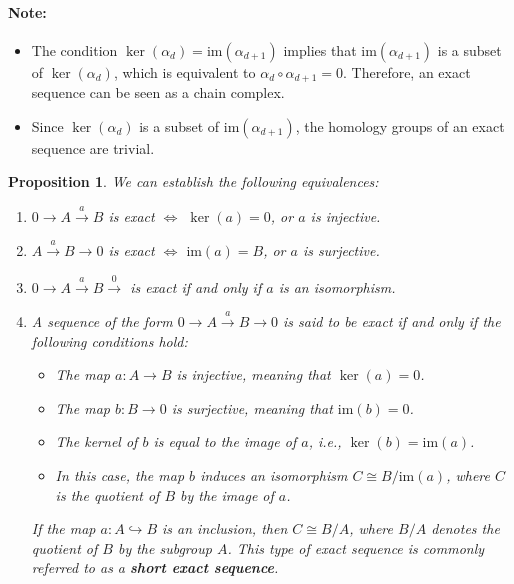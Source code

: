 \documentclass{amsart}
\newtheorem{proposition}[definition]{Proposition}
\begin{document}
\paragraph{Note:}
\begin{itemize}
	\item The condition $\ker(\alpha_d) = \text{im}(\alpha_{d+1})$ implies that $\text{im}(\alpha_{d+1})$ is a subset of $\ker(\alpha_d)$, which is equivalent to $\alpha_d \circ \alpha_{d+1} = 0$. Therefore, an exact sequence can be seen as a chain complex.
	\item Since $\ker(\alpha_d)$ is a subset of $\text{im}(\alpha_{d+1})$, the homology groups of an exact sequence are trivial.
\end{itemize}

\begin{proposition}
We can establish the following equivalences:
\begin{enumerate}
	\item $0 \xrightarrow{} A \xrightarrow{a} B$ is exact $\Longleftrightarrow$ $\ker(a) = 0$, or $a$ is injective.
	\item $A \xrightarrow{a} B \rightarrow 0$ is exact $\Longleftrightarrow$ $\text{im}(a) = B$, or $a$ is surjective.
	\item $0 \xrightarrow{} A \xrightarrow{a} B \xrightarrow 0$ is exact if and only if $a$ is an isomorphism.
	\item A sequence of the form $0 \xrightarrow{} A \xrightarrow{a} B \xrightarrow{} 0$ is said to be exact if and only if the following conditions hold:
	\begin{itemize}
		\item The map $a: A \rightarrow B$ is injective, meaning that $\ker(a) = 0$.
		\item The map $b: B \rightarrow 0$ is surjective, meaning that $\text{im}(b) = 0$.
		\item The kernel of $b$ is equal to the image of $a$, i.e., $\ker(b) = \text{im}(a)$.
		\item In this case, the map $b$ induces an isomorphism $C \cong B/\text{im}(a)$, where $C$ is the quotient of $B$ by the image of $a$.
	\end{itemize}
	If the map $a: A \hookrightarrow B$ is an inclusion, then $C \cong B/A$, where $B/A$ denotes the quotient of $B$ by the subgroup $A$. This type of exact sequence is commonly referred to as a \textbf{short exact sequence}.
\end{enumerate}
\end{proposition}
\end{document}
